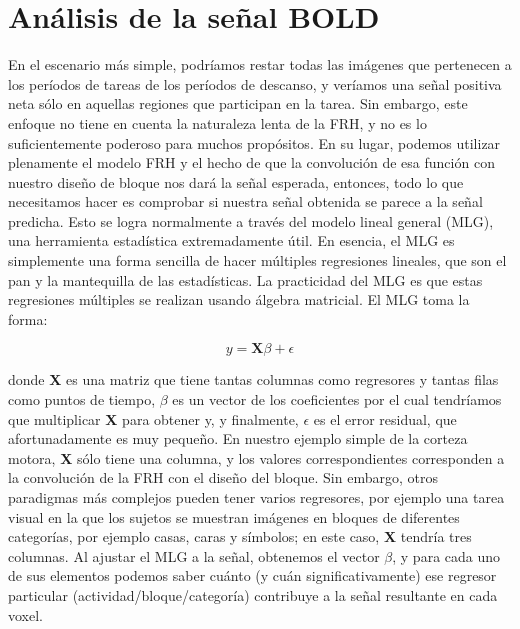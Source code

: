 \documentclass[12pt,a5,twoside]{book}
\begin{document}
\section{Análisis de la señal BOLD}

En el escenario más simple, podríamos restar todas las imágenes que pertenecen a los períodos de tareas de los períodos de descanso, y veríamos una señal positiva neta sólo en aquellas regiones que participan en la tarea. Sin embargo, este enfoque no tiene en cuenta la naturaleza lenta de la FRH, y no es lo suficientemente poderoso para muchos propósitos. En su lugar, podemos utilizar plenamente el modelo FRH y el hecho de que la convolución de esa función con nuestro diseño de bloque nos dará la señal esperada, entonces, todo lo que necesitamos hacer es comprobar si nuestra señal obtenida se parece a la señal predicha. Esto se logra normalmente a través del modelo lineal general (MLG), una herramienta estadística extremadamente útil. En esencia, el MLG es simplemente una forma sencilla de hacer múltiples regresiones lineales, que son el pan y la mantequilla de las estadísticas. La practicidad del MLG es que estas regresiones múltiples se realizan usando álgebra matricial. El MLG toma la forma: 

\begin{equation} 
y = \textbf{X}\beta + \epsilon 
\end{equation} 

donde \textbf{X} es una matriz que tiene tantas columnas como regresores y tantas filas como puntos de tiempo, \(\beta\) es un vector de los coeficientes por el cual tendríamos que multiplicar \textbf{X} para obtener y, y finalmente, \(\epsilon\) es el error residual, que afortunadamente es muy pequeño. En nuestro ejemplo simple de la corteza motora, \textbf{X} sólo tiene una columna, y los valores correspondientes corresponden a la convolución de la FRH con el diseño del bloque. Sin embargo, otros paradigmas más complejos pueden tener varios regresores, por ejemplo una tarea visual en la que los sujetos se muestran imágenes en bloques de diferentes categorías, por ejemplo casas, caras y símbolos; en este caso, \textbf{X} tendría tres columnas. Al ajustar el MLG a la señal, obtenemos el vector \(\beta\), y para cada uno de sus elementos podemos saber cuánto (y cuán significativamente) ese regresor particular (actividad/bloque/categoría) contribuye a la señal resultante en cada voxel. \\
\end{document}
